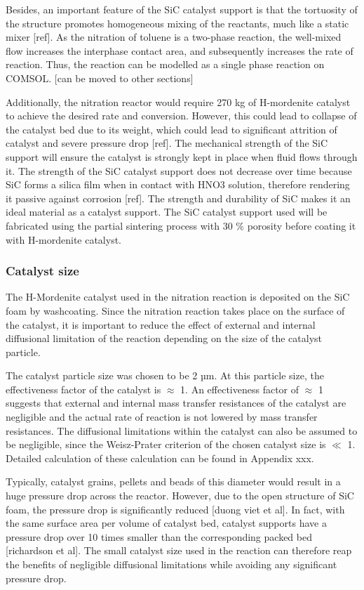 Besides, an important feature of the SiC catalyst support is that the tortuosity of the structure promotes homogeneous mixing of the reactants, much like a static mixer [ref]. As the nitration of toluene is a two-phase reaction, the well-mixed flow increases the interphase contact area, and subsequently increases the rate of reaction. Thus, the reaction can be modelled as a single phase reaction on COMSOL. [can be moved to other sections] 

Additionally, the nitration reactor would require 270 kg of H-mordenite catalyst to achieve the desired rate and conversion. However, this could lead to collapse of the catalyst bed due to its weight, which could lead to significant attrition of catalyst and severe pressure drop [ref]. The mechanical strength of the SiC support will ensure the catalyst is strongly kept in place when fluid flows through it. The strength of the SiC catalyst support does not decrease over time because SiC forms a silica film when in contact with HNO3 solution, therefore rendering it passive against corrosion [ref]. The strength and durability of SiC makes it an ideal material as a catalyst support. The SiC catalyst support used will be fabricated using the partial sintering process with 30 \% porosity before coating it with H-mordenite catalyst.

\subsubsection{Catalyst size}
The H-Mordenite catalyst used in the nitration reaction is deposited on the SiC foam by washcoating. Since the nitration reaction takes place on the surface of the catalyst, it is important to reduce the effect of external and internal diffusional limitation of the reaction depending on the size of the catalyst particle.  

The catalyst particle size was chosen to be 2 µm. At this particle size, the effectiveness factor of the catalyst is $\approx$ 1. An effectiveness factor of $\approx$ 1 suggests that external and internal mass transfer resistances of the catalyst are negligible and the actual rate of reaction is not lowered by mass transfer resistances. The diffusional limitations within the catalyst can also be assumed to be negligible, since the Weisz-Prater criterion of the chosen catalyst size is $\ll$ 1. Detailed calculation of these calculation can be found in Appendix xxx.

Typically, catalyst grains, pellets and beads of this diameter would result in a huge pressure drop across the reactor. However, due to the open structure of SiC foam, the pressure drop is significantly reduced [duong viet et al]. In fact, with the same surface area per volume of catalyst bed, catalyst supports have a pressure drop over 10 times smaller than the corresponding packed bed [richardson et al]. The small catalyst size used in the reaction can therefore reap the benefits of negligible diffusional limitations while avoiding any significant pressure drop.


